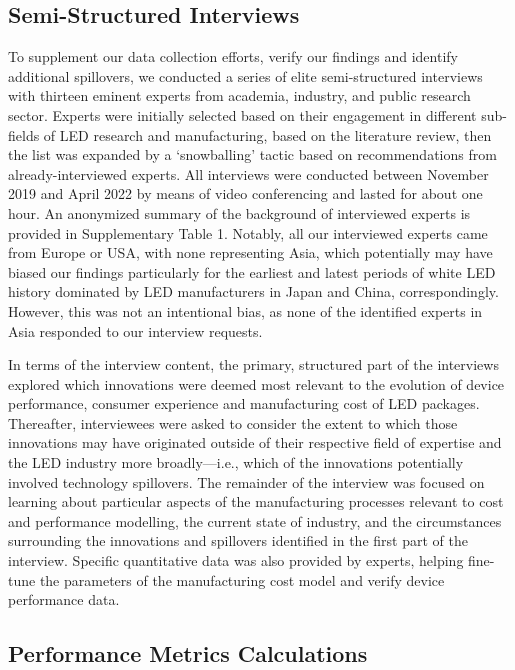 \documentclass[parskip=full]{article}
\begin{document}
\subsection{Semi-Structured Interviews}

To supplement our data collection efforts, verify our findings and identify additional spillovers, we conducted a series of elite semi-structured interviews \cite{tansey2009process} with thirteen eminent experts from academia, industry, and public research sector. Experts were initially selected based on their engagement in different sub-fields of LED research and manufacturing, based on the literature review, then the list was expanded by a ‘snowballing’ tactic based on recommendations from already-interviewed experts. All interviews were conducted between November 2019 and April 2022 by means of video conferencing and lasted for about one hour. An anonymized summary of the background of interviewed experts is provided in Supplementary Table 1. Notably, all our interviewed experts came from Europe or USA, with none representing Asia, which potentially may have biased our findings particularly for the earliest and latest periods of white LED history dominated by LED manufacturers in Japan and China, correspondingly. However, this was not an intentional bias, as none of the identified experts in Asia responded to our interview requests. 

In terms of the interview content, the primary, structured part of the interviews explored which innovations were deemed most relevant to the evolution of device performance, consumer experience and manufacturing cost of LED packages. Thereafter, interviewees were asked to consider the extent to which those innovations may have originated outside of their respective field of expertise and the LED industry more broadly—i.e., which of the innovations potentially involved technology spillovers. The remainder of the interview was focused on learning about particular aspects of the manufacturing processes relevant to cost and performance modelling, the current state of industry, and the circumstances surrounding the innovations and spillovers identified in the first part of the interview. Specific quantitative data was also provided by experts, helping fine-tune the parameters of the manufacturing cost model and verify device performance data.

\subsection{Performance Metrics Calculations}
\label{subsec:performance_metrics}
\end{document}
